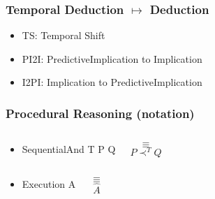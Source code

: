 \documentclass[aspectratio=169]{beamer}
\begin{document}
\begin{frame}
  \frametitle{Temporal Deduction $\mapsto$ Deduction}
  {\small
    \begin{prooftree}
    \end{prooftree}}

  \begin{itemize}
  \item TS: Temporal Shift
  \item PI2I: PredictiveImplication to Implication
  \item I2PI: Implication to PredictiveImplication
  \end{itemize}
\end{frame}

\begin{frame}[fragile]
  \frametitle{Procedural Reasoning (notation)}
  \begin{itemize}
  \item<+->
  \begin{columns}
    \column{1in}
\begin{semiverbatim}
SequentialAnd
  T
  P
  Q
\end{semiverbatim}
    \column{0.5in}
    $$\equiv$$
    \column{1in}
    $$P \prec^T Q$$
  \end{columns}

  \item<+->
  \begin{columns}
    \column{1in}
\begin{semiverbatim}
Execution
  A
\end{semiverbatim}
    \column{0.5in}
    $$\equiv$$
    \column{1in}
    $$\widehat{A}$$
  \end{columns}
  \end{itemize}
\end{frame}
\end{document}
